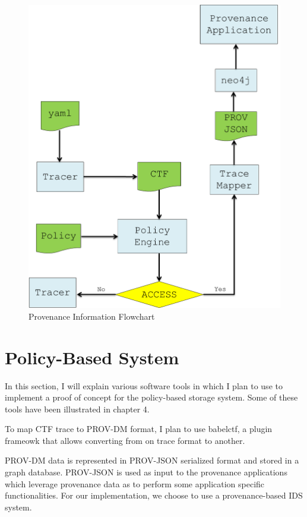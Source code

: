\begin{figure}[tb]
\begin{center}

\includegraphics[width =4.5in]{flow_chart_update.PNG}    
\end{center}
\caption{Provenance Information Flowchart }
\label{flow_chart}
\end{figure}

\section{Policy-Based System}

In this section, I will explain various software tools in which I plan to use to implement a proof of concept for the policy-based storage system. Some of these tools have been illustrated in chapter 4. 


\par To map CTF trace to PROV-DM format, I plan to use babelctf, a plugin frameowk that allows converting from on trace format to another. 


 PROV-DM data is represented in PROV-JSON serialized format and stored in a graph database. PROV-JSON is used as input to the provenance applications which leverage provenance data as to perform some application specific functionalities. For our implementation, we choose to use a provenance-based IDS system.


